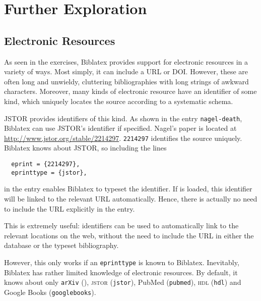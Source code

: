 

{\centering
  \par
  \par
}


\section<1-| beamer:0>{Further Exploration}\label{sec:pellach}

\subsection{Electronic Resources}\label{subsec:eres}

As seen in the exercises, Biblatex provides support for electronic resources in a variety of ways.
Most simply, it can include a URL or DOI.
However, these are often long and unwieldy, cluttering bibliographies with long strings of awkward characters.
Moreover, many kinds of electronic resource have an identifier of some kind, which uniquely locates the source according to a systematic schema.

JSTOR provides identifiers of this kind.
As shown in the entry \verb|nagel-death|, Biblatex can use JSTOR's identifier if specified.
Nagel's paper is located at \url{http://www.jstor.org/stable/2214297}.
\texttt{2214297} identifies the source uniquely.
Biblatex knows about JSTOR, so including the lines
\begin{verbatim}
  eprint = {2214297},
  eprinttype = {jstor},
\end{verbatim}
in the entry enables Biblatex to typeset the identifier.
If  is loaded, this identifier will be linked to the relevant URL automatically.
Hence, there is actually no need to include the URL explicitly in the entry.

This is extremely useful: identifiers can be used to automatically link to the relevant locations on the web, without the need to include the URL in either the database or the typeset bibliography.

However, this only works if an \texttt{eprinttype} is known to Biblatex.
Inevitably, Biblatex has rather limited knowledge of electronic resources.
By default, it knows about only \texttt{arXiv} (), \textsc{jstor} (\texttt{jstor}), PubMed (\texttt{pubmed}), \textsc{hdl} (\texttt{hdl}) and Google Books (\texttt{googlebooks}).

